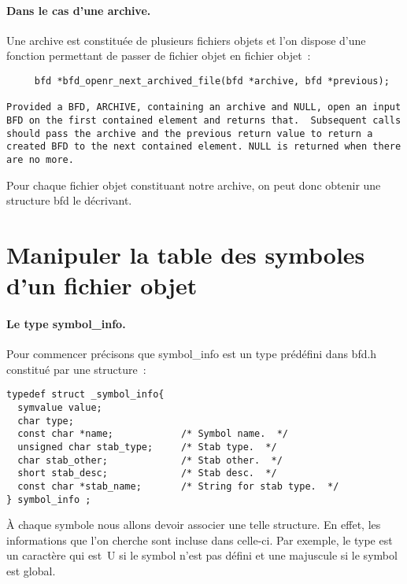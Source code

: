 \documentclass{article}
\begin{document}
\paragraph{Dans le cas d'une archive.}
Une archive est constitu\'ee de plusieurs fichiers objets et l'on
dispose d'une fonction permettant de passer de fichier objet en
fichier objet~:
\begin{verbatim}
     bfd *bfd_openr_next_archived_file(bfd *archive, bfd *previous);

Provided a BFD, ARCHIVE, containing an archive and NULL, open an input
BFD on the first contained element and returns that.  Subsequent calls
should pass the archive and the previous return value to return a
created BFD to the next contained element. NULL is returned when there
are no more.
\end{verbatim}
Pour chaque fichier objet constituant notre archive, on peut donc
obtenir une structure bfd le d\'ecrivant.
\section{Manipuler la table des symboles d'un fichier objet}

\paragraph{Le type symbol\_info.}
Pour commencer pr\'ecisons que symbol\_info est un type pr\'ed\'efini dans bfd.h
constitu\'e par une structure~:
\begin{verbatim}
typedef struct _symbol_info{
  symvalue value;
  char type;
  const char *name;            /* Symbol name.  */
  unsigned char stab_type;     /* Stab type.  */
  char stab_other;             /* Stab other.  */
  short stab_desc;             /* Stab desc.  */
  const char *stab_name;       /* String for stab type.  */
} symbol_info ;
\end{verbatim}
\`A chaque symbole nous allons devoir associer une telle structure. En
effet, les informations que l'on cherche sont incluse dans celle-ci.
Par exemple, le type est un caract\`ere qui est~U si le symbol n'est
pas d\'efini et une majuscule si le symbol est global.
\end{document}
